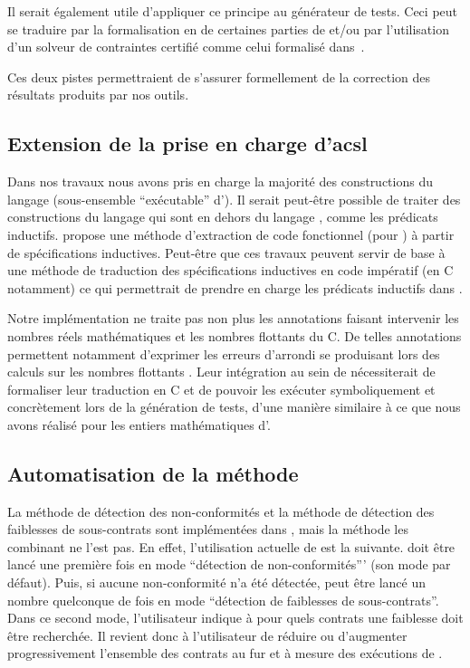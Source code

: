 Il serait également utile d'appliquer ce principe au générateur de tests.
Ceci peut se traduire par la formalisation en \coq de certaines parties de
\pathcrawler et/ou par l'utilisation d'un solveur de contraintes certifié comme
celui formalisé dans~\cite{Carlier/FM12}.

Ces deux pistes permettraient de s'assurer formellement de la correction
des résultats produits par nos outils.


\subsection{Extension de la prise en charge d'acsl}


Dans nos travaux nous avons pris en charge la majorité des constructions du
langage \eacsl (sous-ensemble ``exécutable'' d'\acsl).
Il serait peut-être possible de traiter des constructions du langage \acsl qui
sont en dehors du langage \eacsl, comme les prédicats inductifs.
\cite{Tollitte/CPP12} propose une méthode d'extraction de code fonctionnel
(pour \coq) à partir de spécifications inductives.
Peut-être que ces travaux peuvent servir de base à une méthode de traduction
des spécifications inductives en code impératif (en C notamment) ce qui
permettrait de prendre en charge les prédicats inductifs dans \stady.

Notre implémentation ne traite pas non plus les annotations faisant intervenir
les nombres réels mathématiques et les nombres flottants du C.
De telles annotations permettent notamment d'exprimer les erreurs d'arrondi
se produisant lors des calculs sur les nombres flottants
\cite{Goubault/VMCAI11}.
Leur intégration au sein de \stady nécessiterait de formaliser leur traduction
en C et de pouvoir les exécuter symboliquement et concrètement lors de la
génération de tests, d'une manière similaire à ce que nous avons réalisé pour
les entiers mathématiques d'\eacsl.


\subsection{Automatisation de la méthode}


La méthode de détection des non-conformités et la méthode de détection des
faiblesses de sous-contrats sont implémentées dans \stady, mais la méthode les
combinant ne l'est pas.
En effet, l'utilisation actuelle de \stady est la suivante.
\stady doit être lancé une première fois en mode
``détection de non-conformités''' (son mode par défaut).
Puis, si aucune non-conformité n'a été détectée, \stady peut être lancé un
nombre quelconque de fois en mode ``détection de faiblesses de sous-contrats''.
Dans ce second mode, l'utilisateur indique à \stady pour quels contrats une
faiblesse doit être recherchée.
Il revient donc à l'utilisateur de réduire ou d'augmenter progressivement
l'ensemble des contrats au fur et à mesure des exécutions de \stady.

